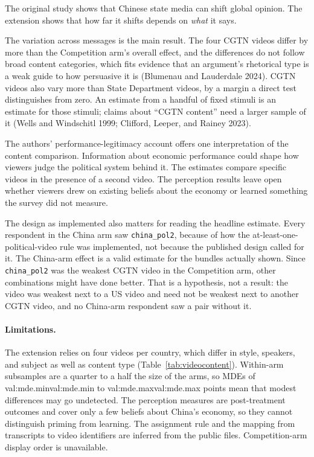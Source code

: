 \documentclass[11pt]{article}
\newcommand{\vid}[1]{\texttt{#1}}
\newcommand{\val}[1]{\ifcsname val:#1\endcsname\else\errmessage{Undefined value: #1}\fi\csname val:#1\endcsname}
\begin{document}
The original study shows that Chinese state media can shift global opinion. The extension shows that how far it shifts depends on \emph{what} it says.

The variation across messages is the main result. The four CGTN videos differ by more than the Competition arm's overall effect, and the differences do not follow broad content categories, which fits evidence that an argument's rhetorical type is a weak guide to how persuasive it is (Blumenau and Lauderdale 2024). CGTN videos also vary more than State Department videos, by a margin a direct test distinguishes from zero. An estimate from a handful of fixed stimuli is an estimate for those stimuli; claims about ``CGTN content'' need a larger sample of it (Wells and Windschitl 1999; Clifford, Leeper, and Rainey 2023).

The authors' performance-legitimacy account offers one interpretation of the content comparison. Information about economic performance could shape how viewers judge the political system behind it. The estimates compare specific videos in the presence of a second video. The perception results leave open whether viewers drew on existing beliefs about the economy or learned something the survey did not measure.

The design as implemented also matters for reading the headline estimate. Every respondent in the China arm saw \vid{china\_pol2}, because of how the at-least-one-political-video rule was implemented, not because the published design called for it. The China-arm effect is a valid estimate for the bundles actually shown. Since \vid{china\_pol2} was the weakest CGTN video in the Competition arm, other combinations might have done better. That is a hypothesis, not a result: the video was weakest next to a US video and need not be weakest next to another CGTN video, and no China-arm respondent saw a pair without it.

\paragraph{Limitations.} The extension relies on four videos per country, which differ in style, speakers, and subject as well as content type (Table~\ref{tab:videocontent}). Within-arm subsamples are a quarter to a half the size of the arms, so MDEs of \val{mde.min} to \val{mde.max} points mean that modest differences may go undetected. The perception measures are post-treatment outcomes and cover only a few beliefs about China's economy, so they cannot distinguish priming from learning. The assignment rule and the mapping from transcripts to video identifiers are inferred from the public files. Competition-arm display order is unavailable.
\end{document}
